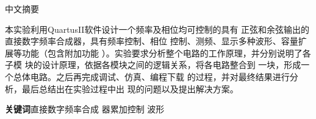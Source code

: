 \documentclass[twoside, openright]{article}
\begin{document}

\pagestyle{fancy}
\renewcommand{\headrulewidth}{0pt}
\fancyhead[LC, RC]{}
\fancyhead[LE, RO]{}
\fancyhead[RE, LO]{}
\fancyfoot[LC, RC]{}
\fancyfoot[LE, RO]{}
\fancyfoot[RE, LO]{}


\newpage

\begin{center}
	\renewcommand{\CJKglue}{\hskip 2pt}\heiti \Title 中文摘要

	\vspace{0.3em}

	\begin{boxedminipage}[][18cm]{\linewidth}
		\begin{spacing}{1.5}

			\vspace{1\ccwd}

			本实验利用QuartusII软件设计一个频率及相位均可控制的具有
			正弦和余弦输出的直接数字频率合成器，具有频率控制、相位
			控制、测频、显示多种波形、容量扩展等功能（包含附加功能
			）。实验要求分析整个电路的工作原理，并分别说明了各子模
			块的设计原理，依据各模块之间的逻辑关系，将各电路整合到
			一块，形成一个总体电路。之后再完成调试、仿真、编程下载
			的过程，并对最终结果进行分析，最后总结出在实验过程中出
			现的问题以及提出解决方案。 \cite{王清2010基于FPGA的直接数字频率合成器设计与仿真,杨虹2012简易直接数字频率合成器的设计与仿真,杨小豹2007直接数字频率合成器在}

			\vspace{2\ccwd}

			\noindent\textbf{关键词}\hspace{1\ccwd}直接数字频率合成
			器\hspace{1\ccwd}累加\hspace{1\ccwd}控制\hspace{1\ccwd}
			波形

		\end{spacing}
	\end{boxedminipage}
\end{center}


\newpage
\end{document}
